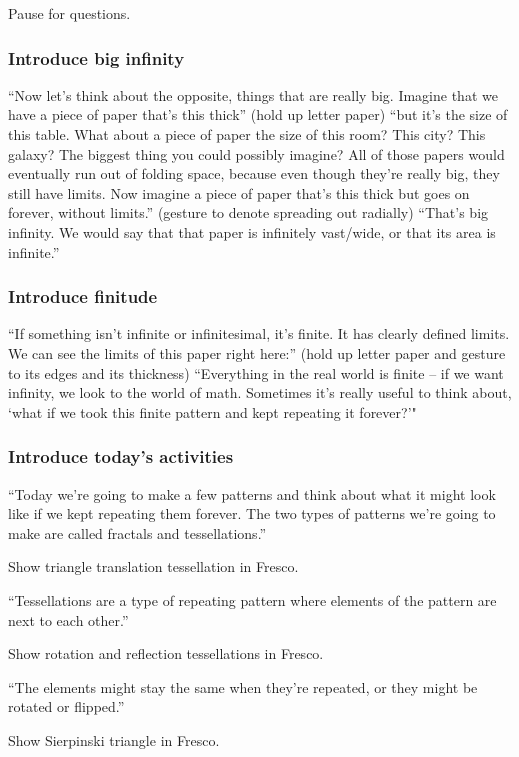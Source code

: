 \documentclass{lessonplan}
\begin{document}
        Pause for questions.
      \subsubsection{Introduce big infinity}
        ``Now let's think about the opposite, things that are really big. Imagine that we have a piece of paper that's 
        this thick'' (hold up letter paper) ``but it's the size of this table. What about a piece of paper the size of 
        this room? This city? This galaxy? The biggest thing you could possibly imagine? All of those papers would 
        eventually run out of folding space, because even though they're really big, they still have limits. Now imagine 
        a piece of paper that's this thick but goes on forever, without limits.'' (gesture to denote spreading out 
        radially) ``That's big infinity. We would say that that paper is infinitely vast/wide, or that its area is 
        infinite.''
      \subsubsection{Introduce finitude}
        ``If something isn't infinite or infinitesimal, it's finite. It has clearly defined limits. We can see the limits 
        of this paper right here:'' (hold up letter paper and gesture to its edges and its thickness) ``Everything in the 
        real world is finite -- if we want infinity, we look to the world of math. Sometimes it's really useful to think 
        about, `what if we took this finite pattern and kept repeating it forever?'"
      \subsubsection{Introduce today's activities}
        ``Today we're going to make a few patterns and think about what it might look like if we kept repeating them 
        forever. The two types of patterns we're going to make are called fractals and tessellations.''

        Show triangle translation tessellation in Fresco.

        ``Tessellations are a type of repeating pattern where elements of the pattern are next to each other.''

        Show rotation and reflection tessellations in Fresco.

        ``The elements might stay the same when they're repeated, or they might be rotated or flipped.''

        Show Sierpinski triangle in Fresco.
\end{document}
